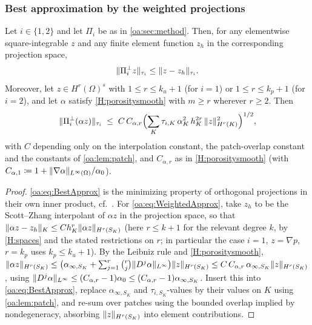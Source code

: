 \subsubsection{Best approximation by the weighted projections}

\begin{lemma}
\label{oa:lem:bestapprox}
Let $i \in \{1,2\}$ and let $\Pi_i$ be as in \cref{oa:sec:method}. Then, for any
elementwise square-integrable $z$ and any finite element function $z_h$ in the
corresponding projection space,
\begin{equation}
  \label{oa:eq:BestApprox}
  \lVert \Pi_i^{\perp} z \rVert_{\tau_i} \le \lVert z - z_h \rVert_{\tau_i}.
\end{equation}
Moreover, let $z \in H^{r}(\Omega)^s$ with $1 \le r \le k_u+1$ (for $i = 1$) or
$1 \le r \le k_p + 1$ (for $i = 2$), and let $\alpha$ satisfy \cref{H:porositysmooth} with
$m \ge r$ wherever $r \ge 2$. Then
\begin{equation}
  \label{oa:eq:WeightedApprox}
  \lVert \Pi_i^{\perp}(\alpha z) \rVert_{\tau_i}
  \;\le\;
  C\, C_{\alpha,r}
  \Bigl( \sum_K \tau_{i,K}\,\alpha_K^2\, h_K^{2r}\,\lVert z \rVert_{H^{r}(K)}^2 \Bigr)^{1/2},
\end{equation}
with $C$ depending only on the interpolation constant, the patch-overlap constant and
the constants of \cref{oa:lem:patch}, and $C_{\alpha,r}$ as in \cref{H:porositysmooth}
(with $C_{\alpha,1} \coloneqq 1 + \lVert \nabla\alpha \rVert_{L^\infty(\Omega)}/\alpha_0$).
\end{lemma}

\begin{proof}
\cref{oa:eq:BestApprox} is the minimizing property of orthogonal projections in their own
inner product, cf.~\cite[Remark~4]{codina2008analysis}. For \cref{oa:eq:WeightedApprox}, take
$z_h$ to be the Scott--Zhang interpolant of $\alpha z$ in the projection space, so that
$\lVert \alpha z - z_h \rVert_{K} \le C h_K^{r} \lVert \alpha z \rVert_{H^{r}(S_K)}$
(here $r \le k+1$ for the relevant degree $k$, by \cref{H:spaces} and the stated restrictions on
$r$; in particular the case $i=1$, $z = \nabla p$, $r = k_p$ uses $k_p \le k_u+1$).
By the Leibniz rule and \cref{H:porositysmooth},
$\lVert \alpha z \rVert_{H^{r}(S_K)}
\le \bigl( \alpha_{\infty,S_K} + \sum_{j=1}^{r}\binom{r}{j}\lVert D^j\alpha \rVert_{L^\infty}\bigr)
\lVert z \rVert_{H^{r}(S_K)}
\le C\,C_{\alpha,r}\,\alpha_{\infty,S_K}\lVert z \rVert_{H^{r}(S_K)}$,
using $\lVert D^j\alpha \rVert_{L^\infty} \le (C_{\alpha,r}-1)\alpha_0 \le
(C_{\alpha,r}-1)\alpha_{\infty,S_K}$. Insert this into \cref{oa:eq:BestApprox}, replace
$\alpha_{\infty,S_K}$ and $\tau_{i,S_K}$-values by their values on $K$ using
\cref{oa:lem:patch}, and re-sum over patches using the bounded overlap implied by
nondegeneracy, absorbing $\lVert z \rVert_{H^r(S_K)}$ into element contributions.
\end{proof}

